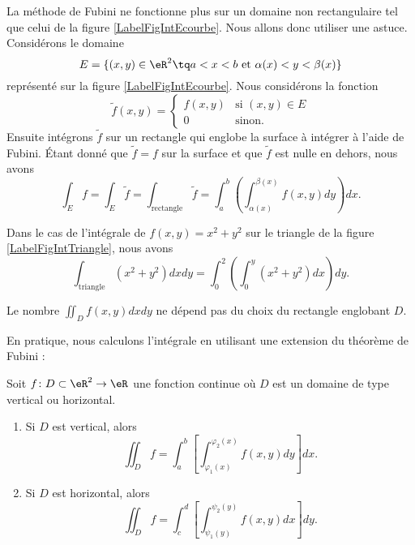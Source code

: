 \newcommand{\CaptionFigIntEcourbe}{Intégrer sur des domaines plus complexes.}


La méthode de Fubini ne fonctionne plus sur un domaine non rectangulaire tel que celui de la figure \ref{LabelFigIntEcourbe}. Nous allons donc utiliser une astuce. Considérons le domaine \begin{equation}
	E=\{ (x,y)\in\eR^2\tq a<x<b\text{ et } \alpha(x)<y<\beta(x) \}
\end{equation}
représenté sur la figure \ref{LabelFigIntEcourbe}. Nous considérons la fonction
\begin{equation}
	\tilde f(x,y)=\begin{cases}
	f(x,y)	&	\text{si $(x,y)\in E$}\\
	0	&	 \text{sinon.}
\end{cases}
\end{equation}
Ensuite intégrons $\tilde f$ sur un rectangle qui englobe la surface à intégrer à l'aide de Fubini. Étant donné que $\tilde f=f$ sur la surface et que $\tilde f$ est nulle en dehors, nous avons
\begin{equation}
	\int_Ef=\int_E\tilde f=\int_{\text{rectangle}}\tilde f=\int_a^b\left( \int_{\alpha(x)}^{\beta(x)}f(x,y)dy \right)dx.
\end{equation}

Dans le cas de l'intégrale de $f(x,y)=x^2+y^2$ sur le triangle de la figure \ref{LabelFigIntTriangle}, nous avons
\begin{equation}
	\int_{\text{triangle}}(x^2+y^2)dx dy=\int_0^2\left( \int_0^y(x^2+y^2)dx \right)dy.
\end{equation}

\begin{remark}
    Le nombre $\iint_{D}f(x,y)dxdy$ ne dépend pas du choix du rectangle englobant $D$.
\end{remark}

En pratique, nous calculons l'intégrale en utilisant une extension du théorème de Fubini :
\begin{theorem}
    Soit $f\colon D\subset\eR^2\to \eR$ une fonction continue où $D$ est un domaine de type vertical ou horizontal.
    \begin{enumerate}
        \item
            Si $D$ est vertical, alors
            \begin{equation}
                \iint_Df=\int_a^b\left[ \int_{\varphi_1(x)}^{\varphi_2(x)}f(x,y)dy \right]dx.
            \end{equation}
        \item
            Si $D$ est horizontal, alors
            \begin{equation}
                \iint_Df=\int_c^d\left[ \int_{\psi_1(y)}^{\psi_2(y)}f(x,y)dx \right]dy.
            \end{equation}
    \end{enumerate}
    
\end{theorem}

